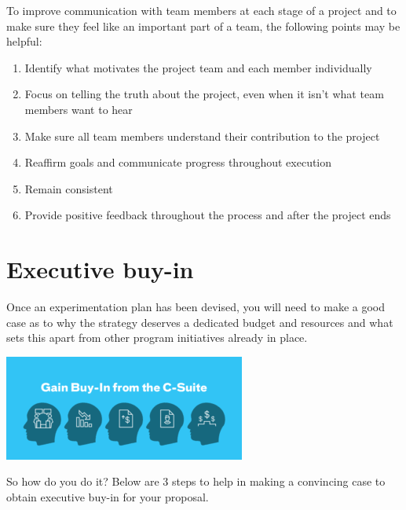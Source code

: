 \documentclass[openany]{book}
\providecommand{\tightlist}{%
  \setlength{\itemsep}{0pt}\setlength{\parskip}{0pt}}
\begin{document}
To improve communication with team members at each stage of a project and to make sure they feel like an important part of a team, the following points may be helpful:

\begin{enumerate}
\def\labelenumi{\arabic{enumi}.}
\tightlist
\item
  Identify what motivates the project team and each member individually
\item
  Focus on telling the truth about the project, even when it isn't what team members want to hear
\item
  Make sure all team members understand their contribution to the project
\item
  Reaffirm goals and communicate progress throughout execution
\item
  Remain consistent
\item
  Provide positive feedback throughout the process and after the project ends
\end{enumerate}

\hypertarget{executive-buy-in}{%
\section{Executive buy-in}\label{executive-buy-in}}

Once an experimentation plan has been devised, you will need to make a good case as to why the strategy deserves a dedicated budget and resources and what sets this apart from other program initiatives already in place.

\includegraphics{fig/buy-in.png}

So how do you do it? Below are 3 steps to help in making a convincing case to obtain executive buy-in for your proposal.
\end{document}

